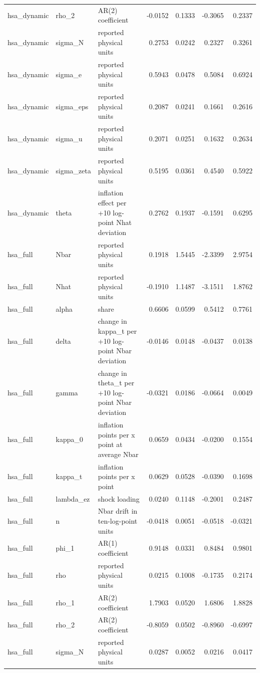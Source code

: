 \begin{tabular}{lllrrrr}
hsa\_dynamic & rho\_2 & AR(2) coefficient & -0.0152 & 0.1333 & -0.3065 & 0.2337 \\
hsa\_dynamic & sigma\_N & reported physical units & 0.2753 & 0.0242 & 0.2327 & 0.3261 \\
hsa\_dynamic & sigma\_e & reported physical units & 0.5943 & 0.0478 & 0.5084 & 0.6924 \\
hsa\_dynamic & sigma\_eps & reported physical units & 0.2087 & 0.0241 & 0.1661 & 0.2616 \\
hsa\_dynamic & sigma\_u & reported physical units & 0.2071 & 0.0251 & 0.1632 & 0.2634 \\
hsa\_dynamic & sigma\_zeta & reported physical units & 0.5195 & 0.0361 & 0.4540 & 0.5922 \\
hsa\_dynamic & theta & inflation effect per +10 log-point Nhat deviation & 0.2762 & 0.1937 & -0.1591 & 0.6295 \\
hsa\_full & Nbar & reported physical units & 0.1918 & 1.5445 & -2.3399 & 2.9754 \\
hsa\_full & Nhat & reported physical units & -0.1910 & 1.1487 & -3.1511 & 1.8762 \\
hsa\_full & alpha & share & 0.6606 & 0.0599 & 0.5412 & 0.7761 \\
hsa\_full & delta & change in kappa\_t per +10 log-point Nbar deviation & -0.0146 & 0.0148 & -0.0437 & 0.0138 \\
hsa\_full & gamma & change in theta\_t per +10 log-point Nbar deviation & -0.0321 & 0.0186 & -0.0664 & 0.0049 \\
hsa\_full & kappa\_0 & inflation points per x point at average Nbar & 0.0659 & 0.0434 & -0.0200 & 0.1554 \\
hsa\_full & kappa\_t & inflation points per x point & 0.0629 & 0.0528 & -0.0390 & 0.1698 \\
hsa\_full & lambda\_ez & shock loading & 0.0240 & 0.1148 & -0.2001 & 0.2487 \\
hsa\_full & n & Nbar drift in ten-log-point units & -0.0418 & 0.0051 & -0.0518 & -0.0321 \\
hsa\_full & phi\_1 & AR(1) coefficient & 0.9148 & 0.0331 & 0.8484 & 0.9801 \\
hsa\_full & rho & reported physical units & 0.0215 & 0.1008 & -0.1735 & 0.2174 \\
hsa\_full & rho\_1 & AR(2) coefficient & 1.7903 & 0.0520 & 1.6806 & 1.8828 \\
hsa\_full & rho\_2 & AR(2) coefficient & -0.8059 & 0.0502 & -0.8960 & -0.6997 \\
hsa\_full & sigma\_N & reported physical units & 0.0287 & 0.0052 & 0.0216 & 0.0417 \\

\end{tabular}
